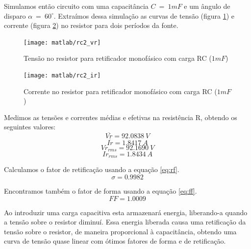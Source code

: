 \documentclass{article}
\begin{document}
Simulamos então circuito com uma capacitância $C\ =\ 1mF$ e um ângulo de disparo $\alpha\ =\ 60^\circ$. Extraímos dessa simulação as curvas de tensão (figura \ref{fig:rc2vr}) e corrente (figura \ref{fig:rc2ir}) no resistor para dois períodos da fonte.
\begin{figure}[H]
	\centering
	\texttt{[image: matlab/rc2\_vr]}
	\caption{Tensão no resistor para retificador monofásico com carga RC ($1mF$)}
	\label{fig:rc2vr}
\end{figure}
\begin{figure}[H]
	\centering
	\texttt{[image: matlab/rc2\_ir]}
	\caption{Corrente no resistor para retificador monofásico com carga RC ($1mF$)}
	\label{fig:rc2ir}
\end{figure}
Medimos as tensões e correntes médias e efetivas na resistência R, obtendo os seguintes valores:
\begin{equation}
\overline{Vr} = 92.0838\ V
\end{equation}
\begin{equation}
\overline{Ir} = 1.8417\ A
\end{equation}
\begin{equation}
Vr_{rms} = 92.1690\ V
\end{equation}
\begin{equation}
Ir_{rms} = 1.8434\ A
\end{equation}

Calculamos o fator de retificação usando a equação \ref{eq:rf}.
\begin{equation}
\sigma = 0.9982
\end{equation}

Encontramos também o fator de forma usando a equação \ref{eq:ff}.
\begin{equation}
FF = 1.0009
\end{equation}

Ao introduzir uma carga capacitiva esta armazenará energia, liberando-a quando a tensão sobre o resistor diminuí. Essa energia liberada causa uma retificação da tensão sobre o resistor, de maneira proporcional à capacitância, obtendo uma curva de tensão quase linear com ótimos fatores de forma e de retificação.


\end{document}
